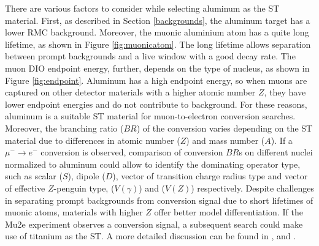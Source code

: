 There are various factors to consider while selecting aluminum as the ST material. 
First, as described in Section \ref{backgrounds}, the aluminum 
target has a lower RMC background. Moreover, the muonic aluminium 
atom has a quite long lifetime, as shown in Figure \ref{fig:muonicatom}. 
The long lifetime allows separation between prompt backgrounds and a 
live window with a good decay rate. The muon DIO endpoint energy, 
further, depends on the type of nucleus, as shown in Figure \ref{fig:endpoint}. 
Aluminum has a high endpoint energy, so when muons are captured on other 
detector materials with a higher atomic number $Z$, they have lower 
endpoint energies and do not contribute to background. For these reasons, aluminum is a 
suitable ST material for muon-to-electron conversion searches.
Moreover, the branching ratio ($BR$) of the conversion varies 
depending on the ST material due to differences in atomic number 
($Z$) and mass number ($A$). If a $\mu^- \to e^-$ conversion
is observed, comparison of conversion $BR$s on different nuclei 
normalized to aluminum could allow to identify the dominating 
operator type, such as scalar ($S$), dipole ($D$), vector of 
transition charge radius type and vector of effective $Z$-penguin type, 
($V(\gamma)$) and ($V(Z)$) respectively. 
Despite challenges in separating prompt backgrounds from 
conversion signal due to short lifetimes of muonic atoms, 
materials with higher $Z$ offer better model differentiation. 
If the Mu2e experiment observes a conversion signal, a subsequent search 
could make use of titanium as the ST. A more detailed discussion can be 
found in \cite{PhysRevD.80.013002}, \cite{PhysRevD.76.059902} and 
\cite{abusalma2018expression}.


